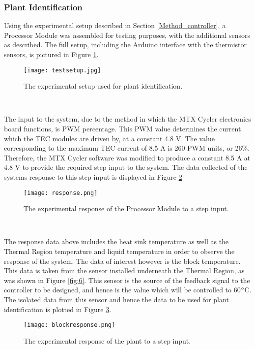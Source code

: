 \subsubsection{Plant Identification}
\label{sec:plantidentification}
Using the experimental setup described in Section \ref{Method_controller}, a Processor Module was assembled for testing purposes, with the additional sensors as described. The full setup, including the Arduino interface with the thermistor sensors, is pictured in Figure \ref{fig:plantidentification]}.

\begin{figure}[!htb]
	\centering
	\texttt{[image: testsetup.jpg]}
	\caption[Plant Identification Setup.]{The experimental setup used for plant identification.}
	\label{fig:plantidentification]}
\end{figure} 
\FloatBarrier

The input to the system, due to the method in which the MTX Cycler electronics board functions, is PWM percentage. This PWM value determines the current which the TEC modules are driven by, at a constant 4.8 V. The value corresponding to the maximum TEC current of 8.5 A is 260 PWM units, or 26\%. Therefore, the MTX Cycler software was modified to produce a constant 8.5 A at 4.8 V to provide the required step input to the system. The data collected of the systems response to this step input is displayed in Figure \ref{fig:response]}

\begin{figure}[!htb]
	\centering
	\texttt{[image: response.png]}
	\caption[Full System Response to Step Input.]{The experimental response of the Processor Module to a step input.}
	\label{fig:response]}
\end{figure} 
\FloatBarrier

The response data above includes the heat sink temperature as well as the Thermal Region temperature and liquid temperature in order to observe the response of the system. The data of interest however is the block temperature. This data is taken from the sensor installed underneath the Thermal Region, as was shown in Figure \ref{fig:6}. This sensor is the source of the feedback signal to the controller to be designed, and hence is the value which will be controlled to 60$\degree$C. The isolated data from this sensor and hence the data to be used for plant identification is plotted in Figure \ref{fig:blockresponse]}.

\begin{figure}[!htb]
	\centering
	\texttt{[image: blockresponse.png]}
	\caption[Plant Response to Step Input.]{The experimental response of the plant to a step input.}
	\label{fig:blockresponse]}
\end{figure} 
\FloatBarrier


